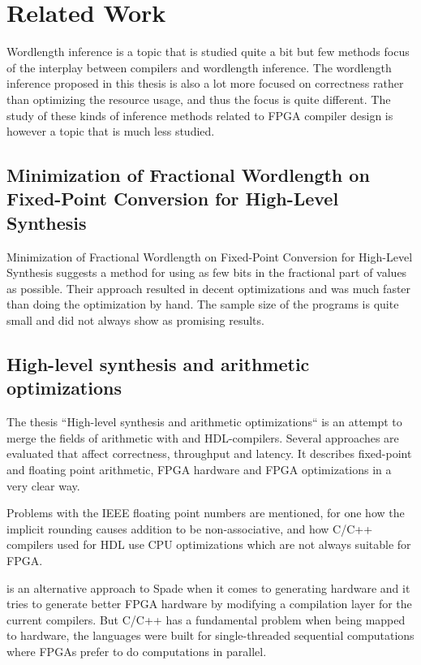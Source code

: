\chapter{Related Work}
Wordlength inference is a topic that is studied quite a bit but few methods focus of the interplay between compilers and wordlength inference. The wordlength inference proposed in this thesis is also a lot more focused on correctness rather than optimizing the resource usage, and thus the focus is quite different. The study of these kinds of inference methods related to FPGA compiler design is however a topic that is much less studied.

\section{Minimization of Fractional Wordlength on Fixed-Point Conversion for High-Level Synthesis}
Minimization of Fractional Wordlength on Fixed-Point Conversion for High-Level Synthesis suggests a method for using as few bits in the fractional part of values as possible. Their approach resulted in decent optimizations and was much faster than doing the optimization by hand. The sample size of the programs is quite small and did not always show as promising results. \cite{src:MinOfFrac}

\section{High-level synthesis and arithmetic optimizations}
The thesis ``High-level synthesis and arithmetic optimizations`` is an attempt to merge the fields of arithmetic with and HDL-compilers. Several approaches are evaluated that affect correctness, throughput and latency. It describes fixed-point and floating point arithmetic, FPGA hardware and FPGA optimizations in a very clear way.

Problems with the IEEE floating point numbers are mentioned, for one how the implicit rounding causes addition to be non-associative, and how C/C++ compilers used for HDL use CPU optimizations which are not always suitable for FPGA.

\citeauthor{src:HLSandOpt} is an alternative approach to Spade when it comes to generating hardware and it tries to generate better FPGA hardware by modifying a compilation layer for the current compilers. But C/C++ has a fundamental problem when being mapped to hardware, the languages were built for single-threaded sequential computations where FPGAs prefer to do computations in parallel. \cite{src:HLSandOpt}

